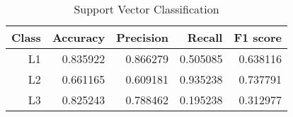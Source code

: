 \begin{table}  \centering \caption{Support Vector Classification} \label{tab:results_svc} \begin{tabular}{rrrrr}    \hline\hline    \textbf{Class} & \textbf{Accuracy} & \textbf{Precision} & \textbf{Recall} & \textbf{F1 score} \\\hline    L1 & 0.835922 & 0.866279 & 0.505085 & 0.638116 \\    L2 & 0.661165 & 0.609181 & 0.935238 & 0.737791 \\    L3 & 0.825243 & 0.788462 & 0.195238 & 0.312977 \\\hline\hline  \end{tabular}\end{table}